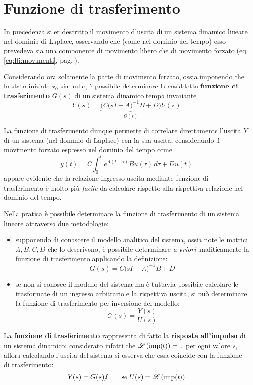 \section{Funzione di trasferimento}
	In precedenza si er descritto il movimento d'uscita di un sistema dinamico lineare nel dominio di Laplace, osservando che (come nel dominio del tempo) esso prevedeva sia una componente di movimento libero che di movimento forzato (eq. \ref{eq:lti:movimenti}, pag. \pageref{eq:lti:movimenti}).
	\begin{concetto} Considerando ora solamente la parte di movimento forzato, ossia imponendo che lo stato iniziale $x_0$ sia nullo, è possibile determinare la cosiddetta \textbf{funzione di trasferimento} $G(s)$ di un sistema dinamico tempo invariante
		\begin{equation}
			Y(s) = \underbrace{\Big(C\big(sI-A\big)^{-1}B+D\Big)}_{G(s)} U(s)
		\end{equation}
	\end{concetto}
	La funzione di trasferimento dunque permette di correlare direttamente l'uscita $Y$ di un sistema (nel dominio di Laplace) con la sua uscita; considerando il movimento forzato espresso nel dominio del tempo come
	\[ y(t) = C\int_0^t e^{A(t-\tau)}Bu(\tau)\, d\tau + Du(t) \]
	appare evidente che la relazione ingresso-uscita mediante funzione di trasferimento è molto più \textit{facile} da calcolare rispetto alla rispettiva relazione nel dominio del tempo.
	
	Nella pratica è possibile determinare la funzione di trasferimento di un sistema lineare attraverso due metodologie:
	\begin{itemize}
		\item supponendo di conoscere il modello analitico del sistema, ossia note le matrici $A,B,C,D$ che lo descrivono, è possibile determinare \textit{a priori} analiticamente la funzione di trasferimento applicando la definizione:
		\[ G(s) = C\big(sI-A\big)^{-1}B+D \]
		\item se non si conosce il modello del sistema ma è tuttavia possibile calcolare le trasformate di un ingresso arbitrario e la rispettiva uscita, si può determinare la funzione di trasferimento per inversione del modello:
		\[ G(s) = \frac{Y(s)}{U(s)}\]
	\end{itemize}
	

	\begin{concetto}
		La \textbf{funzione di trasferimento} rappresenta di fatto la \textbf{risposta all'impulso} di un sistema dinamico: considerato infatti che $\mathscr L \left( \textrm{imp}(t) \right) = 1 $ per ogni valore $s$, allora calcolando l'uscita del sistema si osserva che essa coincide con la funzione di trasferimento:
		\[ Y(s) = G(s) \cancel 1 \qquad \textrm{se } U(s) = \mathscr L \left( \textrm{imp}(t) \right) \]
	\end{concetto}	

